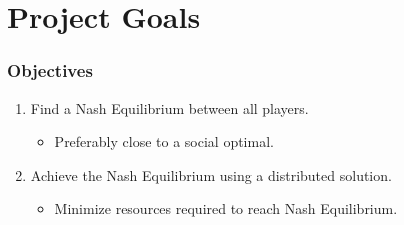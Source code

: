 \documentclass[10pt,tgadventor, onlymath]{beamer}
\begin{document}
%


\section{Project Goals}

\begin{frame}
\frametitle{Objectives}
\begin{enumerate}
\setlength\itemsep{2em}

\item Find a Nash Equilibrium between all players.
\begin{itemize}
\item Preferably close to a social optimal.
\end{itemize}
\item Achieve the Nash Equilibrium using a distributed solution.
\begin{itemize}
\item Minimize resources required to reach Nash Equilibrium.
\end{itemize}
\end{enumerate}
\pause
\begin{center}
\end{center}
\end{frame}
\end{document}
